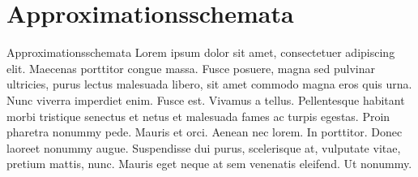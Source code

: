 \section{Approximationsschemata}

\begin{frame}{Approximationsschemata}	
    Lorem ipsum dolor sit amet, consectetuer adipiscing elit. Maecenas porttitor congue massa. Fusce posuere, magna sed pulvinar ultricies, purus lectus malesuada libero, sit amet commodo magna eros quis urna.
    Nunc viverra imperdiet enim. Fusce est. Vivamus a tellus.
    Pellentesque habitant morbi tristique senectus et netus et malesuada fames ac turpis egestas. Proin pharetra nonummy pede. Mauris et orci.
    Aenean nec lorem. In porttitor. Donec laoreet nonummy augue.
    Suspendisse dui purus, scelerisque at, vulputate vitae, pretium mattis, nunc. Mauris eget neque at sem venenatis eleifend. Ut nonummy.      
\end{frame}